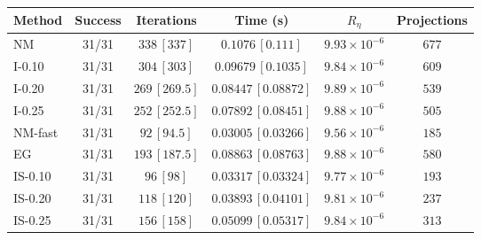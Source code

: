\begin{tabular}{lccccc}
\toprule
Method & Success & Iterations & Time (s) & $R_\eta$ & Projections \\
\midrule
NM & 31/31 & $338\, [337]$ & $0.1076\, [0.111]$ & $9.93\times10^{-6}$ & $677$ \\
I-0.10 & 31/31 & $304\, [303]$ & $0.09679\, [0.1035]$ & $9.84\times10^{-6}$ & $609$ \\
I-0.20 & 31/31 & $269\, [269.5]$ & $0.08447\, [0.08872]$ & $9.89\times10^{-6}$ & $539$ \\
I-0.25 & 31/31 & $252\, [252.5]$ & $0.07892\, [0.08451]$ & $9.88\times10^{-6}$ & $505$ \\
NM-fast & 31/31 & $92\, [94.5]$ & $0.03005\, [0.03266]$ & $9.56\times10^{-6}$ & $185$ \\
EG & 31/31 & $193\, [187.5]$ & $0.08863\, [0.08763]$ & $9.88\times10^{-6}$ & $580$ \\
\midrule
IS-0.10 & 31/31 & $96\, [98]$ & $0.03317\, [0.03324]$ & $9.77\times10^{-6}$ & $193$ \\
IS-0.20 & 31/31 & $118\, [120]$ & $0.03893\, [0.04101]$ & $9.81\times10^{-6}$ & $237$ \\
IS-0.25 & 31/31 & $156\, [158]$ & $0.05099\, [0.05317]$ & $9.84\times10^{-6}$ & $313$ \\
\bottomrule
\end{tabular}
